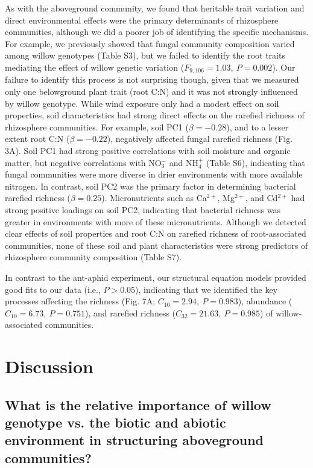 \documentclass[11pt]{article}
\begin{document}
As with the aboveground community, we found that heritable trait
variation and direct environmental effects were the primary determinants
of rhizosphere communities, although we did a poorer job of identifying
the specific mechanisms. For example, we previously showed that fungal
community composition varied among willow genotypes (Table S3), but we
failed to identify the root traits mediating the effect of willow
genetic variation (\(F_{9,106}=1.03,\ P=0.002\)). Our failure to identify this
process is not surprising though, given that we measured only one
belowground plant trait (root C:N) and it was not strongly influenced by
willow genotype. While wind exposure only had a modest effect on soil
properties, soil characteristics had strong direct effects on the
rarefied richness of rhizosphere communities. For example, soil PC1
($\beta = -0.28$), and to a lesser extent root C:N ($\beta =
-0.22$), negatively affected fungal rarefied richness (Fig. 3A). Soil PC1
had strong positive correlations with soil moisture and organic matter,
but negative correlations with NO$_3^-$ and NH$_4^+$ (Table S6), indicating that
fungal communities were more diverse in drier environments with more
available nitrogen. In contrast, soil PC2 was the primary factor in
determining bacterial rarefied richness ($\beta = 0.25$).
Micronutrients such as Ca$^{2+}$, Mg$^{2+}$, and Cd$^{2+}$ had strong positive loadings
on soil PC2, indicating that bacterial richness was greater in
environments with more of these micronutrients. Although we detected
clear effects of soil properties and root C:N on rarefied richness of
root-associated communities, none of these soil and plant
characteristics were strong predictors of rhizosphere community
composition (Table S7).

In contrast to the ant-aphid experiment, our structural equation models
provided good fits to our data (i.e., \(P>0.05\)), indicating
that we identified the key processes affecting the richness (Fig. 7A;
\(C_{10}=2.94,\ P=0.983\)), abundance (\(C_{10}=6.73,\ P=0.751\)), and rarefied richness
(\(C_{32}=21.63,\ P=0.985\)) of willow-associated communities.

\section*{Discussion}

\subsection*{What is the relative importance of willow genotype vs. the
biotic and abiotic environment in structuring aboveground
communities?}
\end{document}
